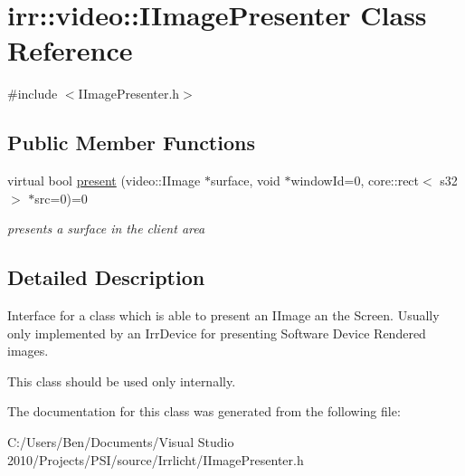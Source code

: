 \hypertarget{classirr_1_1video_1_1_i_image_presenter}{\section{irr\-:\-:video\-:\-:I\-Image\-Presenter Class Reference}
\label{classirr_1_1video_1_1_i_image_presenter}
}


{\ttfamily \#include $<$I\-Image\-Presenter.\-h$>$}

\subsection*{Public Member Functions}
\begin{DoxyCompactItemize}
\item 
\hypertarget{classirr_1_1video_1_1_i_image_presenter_a859d8cc9e634fbdb416a530d8abde24a}{virtual bool \hyperlink{classirr_1_1video_1_1_i_image_presenter_a859d8cc9e634fbdb416a530d8abde24a}{present} (video\-::\-I\-Image $\ast$surface, void $\ast$window\-Id=0, core\-::rect$<$ s32 $>$ $\ast$src=0)=0}\label{classirr_1_1video_1_1_i_image_presenter_a859d8cc9e634fbdb416a530d8abde24a}

\begin{DoxyCompactList}\small\item\em presents a surface in the client area \end{DoxyCompactList}\end{DoxyCompactItemize}


\subsection{Detailed Description}
Interface for a class which is able to present an I\-Image an the Screen. Usually only implemented by an Irr\-Device for presenting Software Device Rendered images.

This class should be used only internally. 

The documentation for this class was generated from the following file\-:\begin{DoxyCompactItemize}
\item 
C\-:/\-Users/\-Ben/\-Documents/\-Visual Studio 2010/\-Projects/\-P\-S\-I/source/\-Irrlicht/I\-Image\-Presenter.\-h\end{DoxyCompactItemize}
